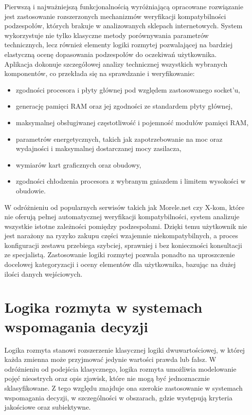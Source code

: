 \documentclass[a4paper,twoside,12pt]{book}
\begin{document}
Pierwszą i najważniejszą funkcjonalnością wyróżniającą opracowane rozwiązanie jest zastosowanie rozszerzonych mechanizmów weryfikacji kompatybilności podzespołów, których brakuje w analizowanych sklepach internetowych. System wykorzystuje nie tylko klasyczne metody porównywania parametrów technicznych, lecz również elementy logiki rozmytej pozwalającej na bardziej elastyczną ocenę dopasowania podzespołów do oczekiwań użytkownika.
\vspace{0.5cm}
\\
Aplikacja dokonuje szczegółowej analizy technicznej wszystkich wybranych komponentów, co przekłada się na sprawdzanie i weryfikowanie:
\begin{itemize}
    \item zgodności procesora i płyty głównej pod względem zastosowanego socket'u,
    \item generację pamięci RAM oraz jej zgodności ze standardem płyty głównej,
    \item maksymalnej obsługiwanej częstotliwość i pojemność modułów pamięci RAM,
    \item parametrów energetycznych, takich jak zapotrzebowanie na moc oraz wydajności i maksymalnej dostarczanej mocy zasilacza,
    \item wymiarów kart graficznych oraz obudowy,
    \item zgodności chłodzenia procesora z wybranym gniazdem i limitem wysokości w obudowie.
\end{itemize}

W odróżnieniu od popularnych serwisów takich jak Morele.net\cite{morele} czy X-kom\cite{xkom}, które nie oferują pełnej automatycznej weryfikacji kompatybilności, system analizuje wszystkie istotne zależności pomiędzy podzespołami. Dzięki temu użytkownik nie jest narażony na ryzyko zakupu części wzajemnie niekompatybilnych, a proces konfiguracji zestawu przebiega szybciej, sprawniej i bez konieczności konsultacji ze specjalistą. Zastosowanie logiki rozmytej pozwala ponadto na uproszczenie docelowej kategoryzacji i oceny elementów dla użytkownika, bazując na dużej ilości danych wejściowych.

\section{Logika rozmyta w systemach wspomagania decyzji}

Logika rozmyta stanowi rozszerzenie klasycznej logiki
dwuwartościowej, w której każda zmienna może przyjmować jedynie wartości
prawda lub fałsz. W odróżnieniu od podejścia klasycznego, logika rozmyta
umożliwia modelowanie pojęć nieostrych oraz opis zjawisk, które nie mogą być
jednoznacznie sklasyfikowane. Z tego względu znajduje ona szerokie zastosowanie
w systemach wspomagania decyzji, w szczególności w obszarach, gdzie występują
kryteria jakościowe oraz subiektywne.
\end{document}
